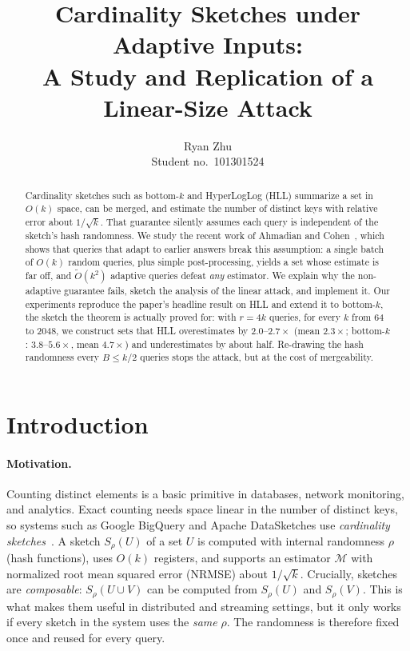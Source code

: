 \documentclass{cccg20}
\title{Cardinality Sketches under Adaptive Inputs:\\ A Study and Replication of a Linear-Size Attack}
\author{Ryan Zhu\\ {\small Student no.\ 101301524}}
\newcommand{\est}{\mathcal{M}}
\begin{document}
\thispagestyle{empty}
\maketitle

\begin{abstract}
Cardinality sketches such as bottom-$k$ and HyperLogLog (HLL) summarize a set in $O(k)$ space, can be merged, and estimate the number of distinct keys with relative error about $1/\sqrt{k}$. That guarantee silently assumes each query is independent of the sketch's hash randomness. We study the recent work of Ahmadian and Cohen~\cite{ahmadian2024}, which shows that queries that adapt to earlier answers break this assumption: a single batch of $O(k)$ random queries, plus simple post-processing, yields a set whose estimate is far off, and $\tilde O(k^2)$ adaptive queries defeat \emph{any} estimator. We explain why the non-adaptive guarantee fails, sketch the analysis of the linear attack, and implement it. Our experiments reproduce the paper's headline result on HLL and extend it to bottom-$k$, the sketch the theorem is actually proved for: with $r=4k$ queries, for every $k$ from 64 to 2048, we construct sets that HLL overestimates by $2.0$--$2.7\times$ (mean $2.3\times$; bottom-$k$: $3.8$--$5.6\times$, mean $4.7\times$) and underestimates by about half. Re-drawing the hash randomness every $B\le k/2$ queries stops the attack, but at the cost of mergeability.
\end{abstract}

\section{Introduction}

\paragraph{Motivation.}
Counting distinct elements is a basic primitive in databases, network monitoring, and analytics. Exact counting needs space linear in the number of distinct keys, so systems such as Google BigQuery and Apache DataSketches use \emph{cardinality sketches}~\cite{flajolet1985,cohen1997,flajolet2007,heule2013}. A sketch $S_\rho(U)$ of a set $U$ is computed with internal randomness $\rho$ (hash functions), uses $O(k)$ registers, and supports an estimator $\est$ with normalized root mean squared error (NRMSE) about $1/\sqrt{k}$. Crucially, sketches are \emph{composable}: $S_\rho(U\cup V)$ can be computed from $S_\rho(U)$ and $S_\rho(V)$. This is what makes them useful in distributed and streaming settings, but it only works if every sketch in the system uses the \emph{same} $\rho$. The randomness is therefore fixed once and reused for every query.
\end{document}

